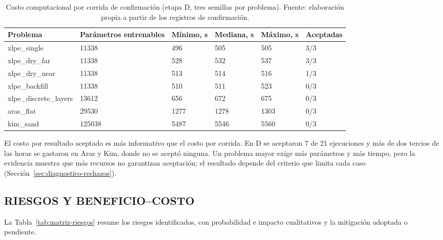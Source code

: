 \begin{table}[htbp]
\centering
\caption{Costo computacional por corrida de confirmación (etapa D, tres semillas por problema). Fuente: elaboración propia a partir de los registros de confirmación.}
\label{tab:costo-computacional}
\begin{tabularx}{\textwidth}{L{3.6cm}C{2.2cm}C{1.7cm}C{1.7cm}C{1.7cm}Y}
\toprule
Problema & Parámetros entrenables & Mínimo, s & Mediana, s & Máximo, s & Aceptadas \\
\midrule
xlpe\_single & 11338 & 496 & 505 & 505 & 3/3 \\
xlpe\_dry\_far & 11338 & 528 & 532 & 537 & 3/3 \\
xlpe\_dry\_near & 11338 & 513 & 514 & 516 & 1/3 \\
xlpe\_backfill & 11338 & 510 & 511 & 523 & 0/3 \\
xlpe\_discrete\_layers & 13612 & 656 & 672 & 675 & 0/3 \\
aras\_flat & 29530 & 1277 & 1278 & 1303 & 0/3 \\
kim\_sand & 125038 & 5487 & 5546 & 5560 & 0/3 \\
\bottomrule
\end{tabularx}
\end{table}

El costo por resultado aceptado es más informativo que el costo por corrida. En D se aceptaron 7 de 21 ejecuciones y más de dos tercios de las horas se gastaron en Aras y Kim, donde no se aceptó ninguna. Un problema mayor exige más parámetros y más tiempo, pero la evidencia muestra que más recursos no garantizan aceptación; el resultado depende del criterio que limita cada caso (Sección~\ref{sec:diagnostico-rechazos}).

\subsection{RIESGOS Y BENEFICIO--COSTO}

La Tabla~\ref{tab:matriz-riesgos} resume los riesgos identificados, con probabilidad e impacto cualitativos y la mitigación adoptada o pendiente.


